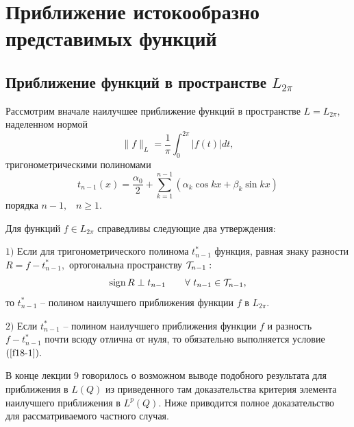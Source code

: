 
 \chapter{Приближение истокообразно представимых функций}



 \section{Приближение  функций в пространстве  $L_{2\pi}$
 }

Рассмотрим вначале  наилучшее приближение функций в пространстве $L= L_{2\pi},$
наделенном нормой
$$
\|f\|_L=\frac{1}{\pi}\int_{0}^{{2\pi}}|f(t)|dt,
$$ тригонометрическими
 полиномами
 $$
 t_{n-1}(x)=\frac{\alpha_0}{2}+\sum\limits_{k=1}^{n-1} (\alpha_k\cos
 kx+\beta_k \sin kx)
 $$
 порядка $n-1,$~ $n\ge 1.$



 \begin{teo}\label{approx_L} \it{ Для функций  $f\in L_{2\pi}$ справедливы
 следующие два утверждения:

 $1)$ Если для тригонометрического полинома $t_{n-1}^{{*}}$ функция, равная знаку разности
 $R=f-t_{n-1}^{{*}},$ ортогональна пространству ${\cal T}_{n-1}:$
 \begin{equation}\label{f18-1}
 \sign R \perp {t_{n-1}}\qquad \forall\  {t_{n-1}\in\mathcal{T}_{n-1}}, %
  \end{equation}
 то $t_{n-1}^*$  --  полином наилучшего приближения функции $f$ в $L_{2\pi}$.


 $2)$ Если  $t_{n-1}^{{*}}$ -- полином наилучшего приближения функции $f$ и разность
 $f-t_{n-1}^{{*}}$ почти всюду отлична от нуля, то обязательно выполняется
 условие~$(\ref{f18-1}).$}
 \end{teo}

 В конце лекции 9 говорилось о возможном выводе подобного
 результата для приближения в $L(Q)$ из приведенного там
 доказательства критерия элемента наилучшего приближения в
 $L^p(Q).$ Ниже приводится полное доказательство для
 рассматриваемого частного случая.


